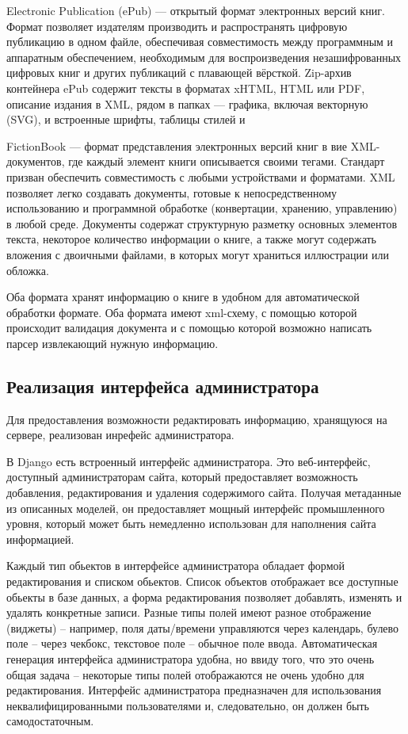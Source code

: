 \documentclass[a4paper, 12pt]{report}
\begin{document}
Electronic Publication (ePub) — открытый формат электронных версий книг. Формат позволяет издателям производить и распространять цифровую публикацию в одном файле, обеспечивая совместимость между программным и аппаратным обеспечением, необходимым для воспроизведения незашифрованных цифровых книг и других публикаций с плавающей вёрсткой.
Zip-архив контейнера ePub содержит тексты в форматах xHTML, HTML или PDF, описание издания в XML, рядом в папках — графика, включая векторную (SVG), и встроенные шрифты, таблицы стилей и \td 

FictionBook — формат представления электронных версий книг в вие XML-документов, где каждый элемент книги описывается своими тегами. Стандарт призван обеспечить совместимость с любыми устройствами и форматами. XML позволяет легко создавать документы, готовые к непосредственному использованию и программной обработке (конвертации, хранению, управлению) в любой среде. Документы содержат структурную разметку основных элементов текста, некоторое количество информации о книге, а также могут содержать вложения с двоичными файлами, в которых могут храниться иллюстрации или обложка.

Оба формата хранят информацию о книге в удобном для автоматической обработки формате. Оба формата имеют xml-схему, с помощью которой происходит валидация документа и с помощью которой возможно написать парсер извлекающий нужную информацию.

\subsection{Реализация интерфейса администратора}
Для предоставления возможности редактировать информацию, хранящуюся на сервере, реализован инрефейс администратора.

В Django есть встроенный интерфейс администратора. Это веб-интерфейс, доступный администраторам сайта, который предоставляет возможность добавления, редактирования и удаления содержимого сайта. Получая метаданные из описанных моделей, он предоставляет мощный интерфейс промышленного уровня, который может быть немедленно использован для наполнения сайта информацией.

Каждый тип обьектов в интерфейсе администратора обладает формой редактирования и списком обьектов. Список объектов отображает все доступные обьекты в базе данных, а форма редактирования позволяет добавлять, изменять и удалять конкретные записи. 
Разные типы полей имеют разное отображение (виджеты) -- например, поля даты/времени управляются через календарь, булево поле -- через чекбокс, текстовое поле -- обычное поле ввода. 
Автоматическая генерация интерфейса администратора удобна, но ввиду того, что это очень общая задача -- некоторые типы полей отображаются не очень удобно для редактирования. Интерфейс администратора предназначен для использования неквалифицированными пользователями и, следовательно, он должен быть самодостаточным.
\end{document}
